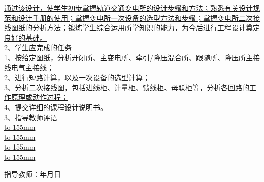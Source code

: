 \uline{通过该设计，使学生初步掌握轨道交通变电所的设计步骤和方法；熟悉有关设计规范和设计手册的使用；掌握变电所一次设备的选型方法和步骤；掌握变电所二次接线图纸的分析方法；锻炼学生综合运用所学知识的能力，为今后进行工程设计奠定良好的基础。}
\\2、学生应完成的任务\\
\noindent
\uline{1、按给定图纸，分析开闭所、主变电所、牵引/降压混合所、跟随所、降压所主接线电气主接线；\\                                   2、进行短路计算，以及一次设备的选型计算；\\                                                            
	   3、分析二次接线图，包括进线柜、计量柜、馈线柜、母联柜等，分析各回路的工作原理或动作过程；  \\                       4、提交详细的课程设计说明书。
}
\\3、指导教师评语\\
\underline{\hbox to 155mm{}} \\
\underline{\hbox to 155mm{}} \\
\underline{\hbox to 155mm{}} \\
\underline{\hbox to 155mm{}} \\
\vfill

指导教师：\hspace{10cm}年\hspace{1cm}月\hspace{1cm}日